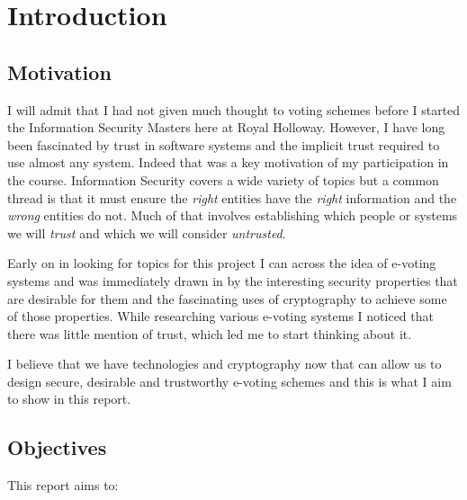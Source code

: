 
\chapter{Introduction}
\label{ch:intro}

\section{Motivation}
\label{ch:intro:motiv}

I will admit that I had not given much thought to voting schemes before I started the Information Security Masters here at Royal Holloway. However, I have long been fascinated by trust in software systems and the implicit trust required to use almost any system. Indeed that was a key motivation of my participation in the course. Information Security covers a wide variety of topics but a common thread is that it must ensure the \emph{right} entities have the \emph{right} information and the \emph{wrong} entities do not. Much of that involves establishing which people or systems we will \emph{trust} and which we will consider \emph{untrusted}.

Early on in looking for topics for this project I can across the idea of e-voting systems and was immediately drawn in by the interesting security properties that are desirable for them and the fascinating uses of cryptography to achieve some of those properties. While researching various e-voting systems I noticed that there was little mention of trust, which led me to start thinking about it.

I believe that we have technologies and cryptography now that can allow us to design secure, desirable and trustworthy e-voting schemes and this is what I aim to show in this report.


\section{Objectives}
\label{ch:intro:object}


This report aims to:

